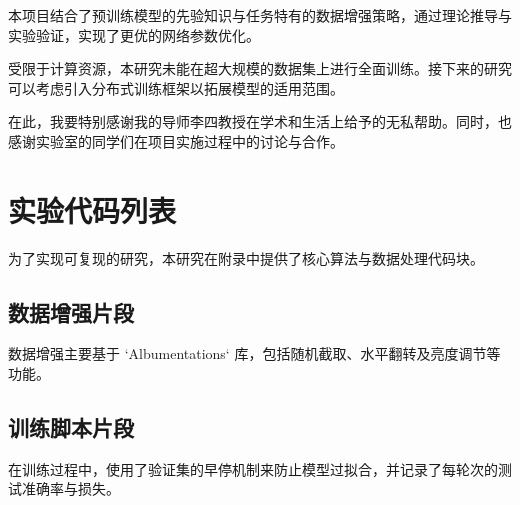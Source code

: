 \documentclass[utf8]{lightweight-thesis}
\begin{document}
    \begin{innovation}
        本项目结合了预训练模型的先验知识与任务特有的数据增强策略，通过理论推导与实验验证，实现了更优的网络参数优化。
    \end{innovation}

    \begin{discussion}
        受限于计算资源，本研究未能在超大规模的数据集上进行全面训练。接下来的研究可以考虑引入分布式训练框架以拓展模型的适用范围。
    \end{discussion}

    \begin{acknowledgement}
        在此，我要特别感谢我的导师李四教授在学术和生活上给予的无私帮助。同时，也感谢实验室的同学们在项目实施过程中的讨论与合作。
    \end{acknowledgement}

    \begin{references}
        
        
    \end{references}

    \thesisappendix


    \chapter{实验代码列表}


    为了实现可复现的研究，本研究在附录中提供了核心算法与数据处理代码块。


    \section{数据增强片段}


    数据增强主要基于 `Albumentations` 库，包括随机截取、水平翻转及亮度调节等功能。


    \section{训练脚本片段}


    在训练过程中，使用了验证集的早停机制来防止模型过拟合，并记录了每轮次的测试准确率与损失。


\end{document}
